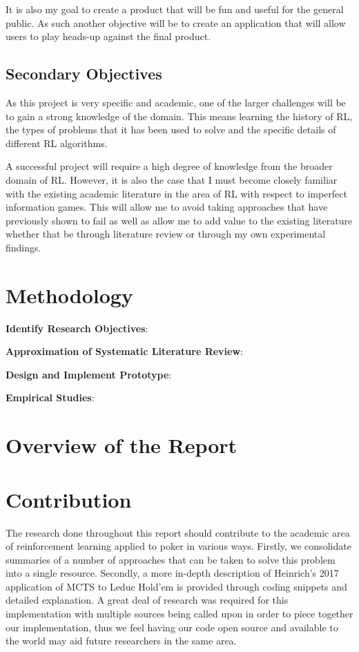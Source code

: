 It is also my goal to create a product that will be fun and useful for the general public.
As such another objective will be to create an application that will allow users to play heads-up against the final product.

\subsection{Secondary Objectives}\label{subsec:secondaryObjectives}
As this project is very specific and academic, one of the larger challenges will be to gain a strong knowledge
of the domain.
This means learning the history of RL, the types of problems that it has been used to solve and the specific details of
different RL algorithms.

A successful project will require a high degree of knowledge from the broader domain of RL. However, it is also the case
that I must become closely familiar with the existing academic literature in the area of RL with respect to imperfect
information games.
This will allow me to avoid taking approaches that have previously shown to fail as well as allow me to add value to
the existing literature whether that be through literature review or through my own experimental findings.


\section{Methodology}\label{sec:methodology}

\textbf{Identify Research Objectives}:

\textbf{Approximation of Systematic Literature Review}:

\textbf{Design and Implement Prototype}:

\textbf{Empirical Studies}:

\section{Overview of the Report}\label{sec:reportOverview}


\section{Contribution}\label{sec:contribution}
The research done throughout this report should contribute to the academic area of reinforcement
learning applied to poker in various ways.
Firstly, we consolidate summaries of a number of approaches that can be taken to solve this problem into a single
resource.
Secondly, a more in-depth description of Heinrich's 2017 application of MCTS to Leduc Hold'em is
provided through coding snippets and detailed explanation.
A great deal of research was required for this implementation with multiple sources being called
upon in order to piece together our implementation, thus we feel having our code
open source and available to the world may aid future researchers in the same area.

